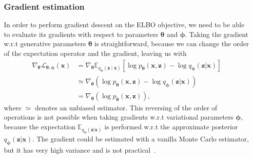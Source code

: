 \documentclass[final,3p,times,twocolumn]{elsarticle}
\begin{document}
\subsubsection{Gradient estimation}
\label{subsec:gradest}
In order to perform gradient descent on the ELBO objective, we need to be able to evaluate its gradients with respect to parameters $\boldsymbol{\theta}$ and $\boldsymbol{\phi}$. Taking the gradient w.r.t generative parameters $\boldsymbol{\theta}$ is straightforward, because we can change the order of the expectation operator and the gradient, leaving us with
\begin{equation}
	\begin{aligned} 
		\nabla_{\boldsymbol{\theta}} \mathcal{L}_{\boldsymbol{\theta}, \boldsymbol{\phi}}(\mathbf{x}) &=\nabla_{\boldsymbol{\theta}} 	\mathbb{E}_{q_{\boldsymbol{\phi}}(\mathbf{z} \mid \mathbf{x})}\left[\log p_{\boldsymbol{\theta}}(\mathbf{x}, \mathbf{z})-\log q_{\boldsymbol{\phi}}(\mathbf{z} | \mathbf{x})\right] \\  & \simeq \nabla_{\boldsymbol{\theta}}\left(\log p_{\boldsymbol{\theta}}(\mathbf{x}, \mathbf{z})-\log q_{\boldsymbol{\phi}}(\mathbf{z} | \mathbf{x})\right) \\ &=\nabla_{\boldsymbol{\theta}}\left(\log p_{\boldsymbol{\theta}}(\mathbf{x}, \mathbf{z})\right) ,
	\end{aligned}
\end{equation}
where $\simeq$ denotes an unbiased estimator. This reversing of the order of operations is not possible when taking gradients w.r.t variational parameters $\boldsymbol{\phi}$, because the expectation $\mathbb{E}_{q_{\boldsymbol{\phi}}(\mathbf{z} | \mathbf{x})}$ is performed w.r.t the approximate posterior $q_{\boldsymbol{\phi}}(\mathbf{z} | \mathbf{x})$. The gradient could be estimated with a vanilla Monte Carlo estimator, but it has very high variance and is not practical~\cite{kingma2013auto}. 
\end{document}

